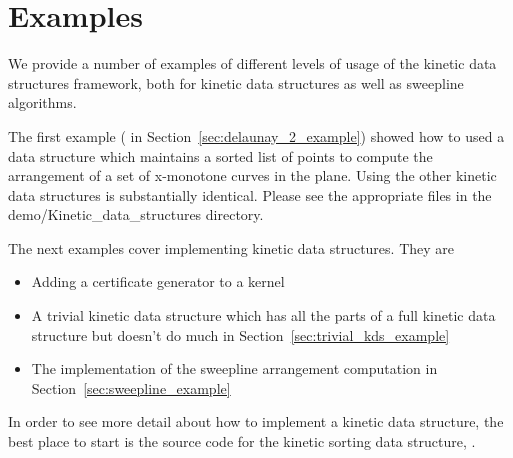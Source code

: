 \section{Examples}
\label{sec:examples}

We provide a number of examples of different levels of usage of the
kinetic data structures framework, both for kinetic data structures as
well as sweepline algorithms.

The first example ( in Section~\ref{sec:delaunay_2_example}) showed
how to used a data structure which maintains a sorted list of points
to compute the arrangement of a set of x-monotone curves in the
plane. Using the other kinetic data structures is substantially
identical. Please see the appropriate files in the
demo/Kinetic\_data\_structures directory.

The next examples cover implementing kinetic data structures. They are
\begin{itemize}
\item Adding a certificate generator to a kernel
\item A trivial kinetic data structure which has all the parts of a
full kinetic data structure but doesn't do much in
Section~\ref{sec:trivial_kds_example}
\item The implementation of the sweepline arrangement computation in
  Section~\ref{sec:sweepline_example}
\end{itemize}

In order to see more detail about how to implement a kinetic data structure, the best place to start is the source code for the kinetic sorting data structure, .





